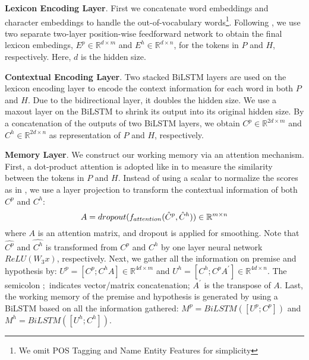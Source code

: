 \documentclass[11pt,a4paper]{article}
\begin{document}
\noindent\textbf{Lexicon Encoding Layer}. 
First we concatenate word embeddings and character embeddings to handle the out-of-vocabulary words\footnote{We omit POS Tagging and Name Entity Features for simplicity}.  
Following \cite{liu18san}, we use two separate two-layer position-wise feedforward network  \cite{vaswani2017attention} to obtain the final lexicon embedings, $E^p \in \mathbb{R}^{d \times m}$ and $E^h\in \mathbb{R}^{d \times n}$, for the tokens in $P$ and $H$, respectively. Here, $d$ is the hidden size.

\noindent\textbf{Contextual Encoding Layer}. Two stacked BiLSTM layers are used on the lexicon encoding layer to encode the context information for each word in both $P$ and $H$. Due to the bidirectional layer, it doubles the hidden size. We use a maxout layer \cite{goodfellow2013maxout} on the BiLSTM to shrink its output into its original hidden size. By a concatenation of the outputs of two BiLSTM layers, we obtain $C^p\in \mathbb{R}^{2d \times m}$ and $C^h\in \mathbb{R}^{2d \times n}$ as representation of $P$ and $H$, respectively.

\noindent\textbf{Memory Layer}. We construct our working memory via an attention mechanism. 
First, a dot-product attention is adopted like in \cite{vaswani2017attention} to measure the similarity between the tokens in $P$ and $H$.
Instead of using a scalar to normalize the scores as in \cite{vaswani2017attention}, we use a layer projection to transform the contextual information of both $C^p$ and $C^h$:
\begin{equation}
A=dropout(f_{attention}(\hat{C}^p, \hat{C}^h)) \in \mathbb{R}^{m \times n}\\
\label{eq:align}
\end{equation}
where $A$ is an attention matrix, and dropout is applied for smoothing. 
Note that $\hat{C^p}$ and $\hat{C^h}$ is transformed from $C^p$ and $C^h$ by one layer neural network $ReLU(W_3x)$, respectively. 
Next, we gather all the information on premise and hypothesis by: $U^p = \left[C^p; C^hA\right] \in \mathbb{R}^{4d \times m}$ and $U^h = \left[C^h ; C^pA^{\prime}\right] \in \mathbb{R}^{4d \times n}$.
The semicolon $;$ indicates vector/matrix concatenation; $A^{\prime}$ is the transpose of $A$.
Last, the working memory of the premise and hypothesis is generated by using a BiLSTM based on all the information gathered: $M^p=BiLSTM([U^p; C^p])$ and $M^h=BiLSTM([U^h; C^h])$.
\end{document}
